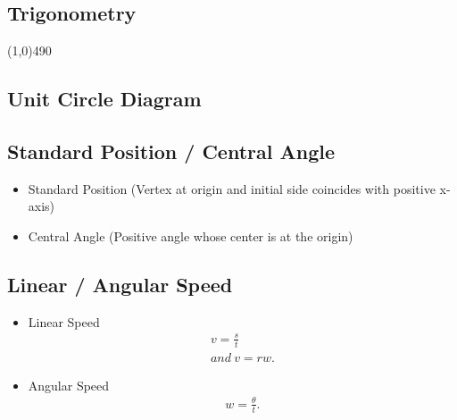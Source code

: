 \documentclass{report}
\begin{document}
      \pagebreak \bigbreak \noindent
      \begin{center}
        \section{\Large{Trigonometry}}
      \end{center}
      \line(1,0){490}
      
      \bigbreak \noindent \bigbreak \noindent 
      \subsection{Unit Circle Diagram}
      \begin{figure}[ht]
          \centering
          \def\svgwidth{\columnwidth}
          \label{fig:unitcirce}
      \end{figure}

      \pagebreak \bigbreak \noindent
      \subsection{Standard Position / Central Angle}
      \begin{itemize}
        \item Standard Position (Vertex at origin and initial side coincides with positive x-axis)
        \item Central Angle (Positive angle whose center is at the origin)
      \end{itemize}

        \bigbreak \noindent \bigbreak \noindent 
        \subsection{
          Linear / Angular Speed
        }
        \begin{itemize}
        \item Linear Speed
          \begin{align*}
            v = \frac{s}{t} \\
            and\ 
            v = rw
          .\end{align*}
        \item Angular Speed
          \begin{align*}
            w = \frac{\theta}{t}            
          .\end{align*}
        \end{itemize}
\end{document}
